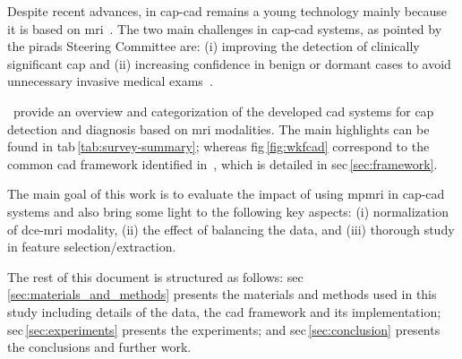 \documentclass[num-refs]{wiley-article}
\begin{document}
Despite recent advances, in \ac{cap}-\ac{cad} remains a young technology mainly
because it is based on \ac{mri}~\cite{Hegde2013}.
%
The two main challenges in \ac{cap}-\ac{cad} systems, as pointed by the
\ac{pirads} Steering Committee are: (i) improving the detection of clinically
significant \ac{cap} and (ii) increasing confidence in benign or dormant cases
to avoid unnecessary invasive medical exams~\citep{weinreb2016pi}.

\citeauthor{lemaitre2015computer}\,\cite{lemaitre2015computer} provide an
overview and categorization of the developed \acs{cad} systems for \ac{cap}
detection and diagnosis based on \ac{mri} modalities.
The main highlights can be
found in \acs{tab}\,\ref{tab:survey-summary};
whereas
\acs{fig}\,\ref{fig:wkfcad} correspond to the common \ac{cad} framework
identified in~\cite{lemaitre2015computer}, which is detailed in \acs{sec}\,\ref{sec:framework}.

The main goal of this work is to evaluate the impact of using \ac{mpmri} in
\ac{cap}-\ac{cad} systems and also bring some light to the following key aspects:
(i) normalization of \ac{dce}-\ac{mri} modality,
(ii) the effect of balancing the data,
and (iii) thorough study in feature selection/extraction.

The rest of this document is structured as follows:
\acs{sec}\,\ref{sec:materials_and_methods} presents the materials and methods used in
this study including details of the data, the \ac{cad} framework and its
implementation; \acs{sec}\,\ref{sec:experiments} presents the experiments; and
\ac{sec}\,\ref{sec:conclusion} presents the conclusions and further work.
\end{document}
